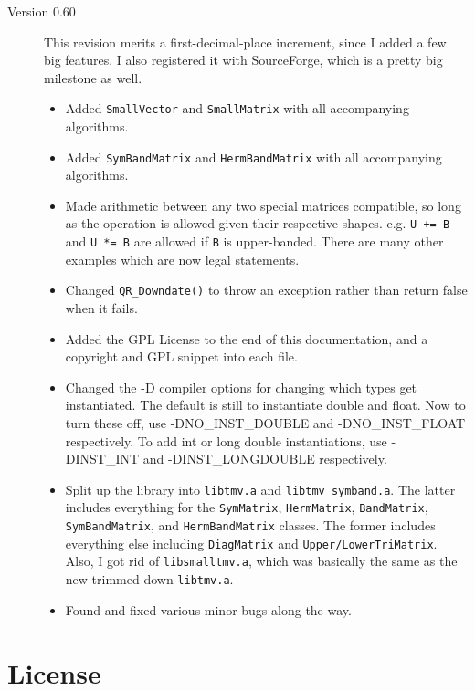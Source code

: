 \documentclass[twoside,letterpaper,11pt]{article}
\renewcommand{\tt}[1]{{\texttt {#1}}}
\begin{document}
\begin{description}
\begin{itemize}
\end{itemize}

\item[Version 0.60]
This revision merits a first-decimal-place increment, since I added a 
few big features.  I also registered it with SourceForge, 
which is a pretty big milestone as well.
\begin{itemize}
\item
Added \tt{SmallVector} and \tt{SmallMatrix} with all accompanying algorithms.
\item 
Added \tt{SymBandMatrix} and \tt{HermBandMatrix} with all accompanying algorithms.
\item
Made arithmetic between any two special matrices compatible, so long as 
the operation is allowed given their respective shapes.  
e.g. \tt{U += B} and \tt{U *= B} are allowed if \tt{B} is upper-banded.  
There are many other examples which are now legal statements.
\item
Changed \tt{QR\_Downdate()} to throw an exception rather than return false
when it fails.
\item
Added the GPL License to the end of this documentation, and a copyright
and GPL snippet into each file.
\item
Changed the -D compiler options for changing which types get instantiated.
The default is still to instantiate double and float.  Now to turn these
off, use -DNO\_INST\_DOUBLE and -DNO\_INST\_FLOAT respectively.  To
add int or long double instantiations, use -DINST\_INT and 
-DINST\_LONGDOUBLE respectively.
\item
Split up the library into \tt{libtmv.a} and \tt{libtmv\_symband.a}.  The
latter includes everything for the \tt{SymMatrix}, \tt{HermMatrix}, 
\tt{BandMatrix}, \tt{SymBandMatrix}, and \tt{HermBandMatrix} classes.
The former includes everything else including \tt{DiagMatrix} and
\tt{Upper/LowerTriMatrix}.  Also, I got rid of \tt{libsmalltmv.a}, which
was basically the same as the new trimmed down \tt{libtmv.a}.
\item 
Found and fixed various minor bugs along the way.

\end{itemize}

\end{description}

\newpage
\section{License}
\label{license}
\end{document}
